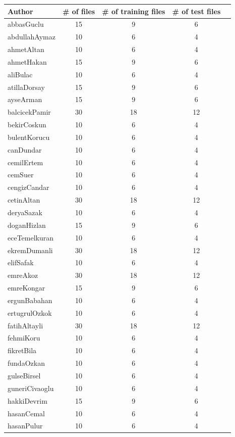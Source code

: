 \documentclass[twocolumn,preprintnumbers,amsmath,amssymb,superscriptaddress,pre]{revtex4}
\theoremstyle{plain}%
\theoremstyle{definition}
\theoremstyle{remark}
\begin{document}
\iffalse
\pagebreak
\begin{table}
\begin{adjustbox}{totalheight=\baselineskip}
\begin{tabular}{ |l|c|c|c|c } 
 \hline
Author & \# of files & \# of training files & \# of test files \\
 \hline
  \hline
abbasGuclu & 15 & 9 & 6 \\
abdullahAymaz & 10 & 6 & 4 \\
ahmetAltan & 10 & 6 & 4 \\
ahmetHakan & 15 & 9 & 6 \\
aliBulac & 10 & 6 & 4 \\
atillaDorsay & 15 & 9 & 6 \\
ayseArman & 15 & 9 & 6 \\
balcicekPamir & 30 & 18 & 12 \\
bekirCoskun & 10 & 6 & 4 \\
bulentKorucu & 10 & 6 & 4 \\
canDundar & 10 & 6 & 4 \\
cemilErtem & 10 & 6 & 4 \\
cemSuer & 10 & 6 & 4 \\
cengizCandar & 10 & 6 & 4 \\
cetinAltan & 30 & 18 & 12 \\
deryaSazak & 10 & 6 & 4 \\
doganHizlan & 15 & 9 & 6 \\
eceTemelkuran & 10 & 6 & 4 \\
ekremDumanli & 30 & 18 & 12 \\
elifSafak & 10 & 6 & 4 \\
emreAkoz & 30 & 18 & 12 \\
emreKongar & 15 & 9 & 6 \\
ergunBabahan & 10 & 6 & 4 \\
ertugrulOzkok & 10 & 6 & 4 \\
fatihAltayli & 30 & 18 & 12 \\
fehmiKoru & 10 & 6 & 4 \\
fikretBila & 10 & 6 & 4 \\
fundaOzkan & 10 & 6 & 4 \\
gulseBirsel & 10 & 6 & 4 \\
guneriCivaoglu & 10 & 6 & 4 \\
hakkiDevrim & 15 & 9 & 6 \\
hasanCemal & 10 & 6 & 4 \\
hasanPulur & 10 & 6 & 4 \\

\end{tabular}
\end{adjustbox}
\end{table}
\end{document}

